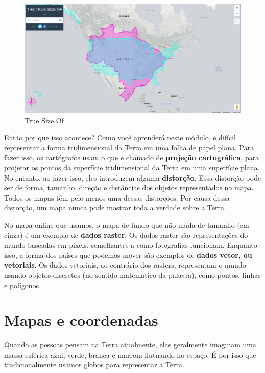 \documentclass[
  portuguese,
]{krantz}
\begin{document}
\begin{figure}
\centering
\includegraphics{media/modulo0/true-size-of.png}
\caption{True Size Of}
\end{figure}

Então por que isso acontece? Como você aprenderá neste módulo, é difícil representar a forma tridimensional da Terra em uma folha de papel plana. Para fazer isso, os cartógrafos usam o que é chamado de \textbf{projeção cartográfica}, para projetar os pontos da superfície tridimensional da Terra em uma superfície plana. No entanto, ao fazer isso, eles introduzem alguma \textbf{distorção}. Essa distorção pode ser de forma, tamanho, direção e distâncias dos objetos representados no mapa. Todos os mapas têm pelo menos uma dessas distorções. Por causa dessa distorção, um mapa nunca pode mostrar toda a verdade sobre a Terra.

No mapa online que usamos, o mapa de fundo que não muda de tamanho (em cinza) é um exemplo de \textbf{dados raster}. Os dados raster são representações do mundo baseadas em pixels, semelhantes a como fotografias funcionam. Enquanto isso, a forma dos países que podemos mover são exemplos de \textbf{dados vetor, ou vetoriais}. Os dados vetoriais, ao contrário dos rasters, representam o mundo usando objetos discretos (no sentido matemático da palavra), como pontos, linhas e polígonos.

\hypertarget{mapas-e-coordenadas}{%
\section{Mapas e coordenadas}\label{mapas-e-coordenadas}}

Quando as pessoas pensam na Terra atualmente, elas geralmente imaginam uma massa esférica azul, verde, branca e marrom flutuando no espaço. É por isso que tradicionalmente usamos globos para representar a Terra.
\end{document}
